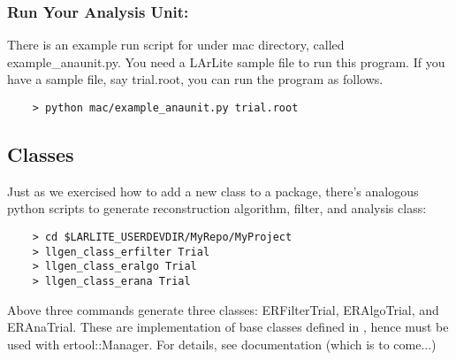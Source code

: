 \subsubsection{Run Your Analysis Unit: \PyROOT}
\label{sec:yourrunscript}
There is an example \python run script for \anaunit under {\ttfamily mac} directory, called 
{\ttfamily example\_anaunit.py}. You need a LArLite sample \ROOT file to run this program. 
If you have a sample file, say {\ttfamily trial.root}, you can run the program as follows.
\begin{lstlisting}
    > python mac/example_anaunit.py trial.root
\end{lstlisting}

\subsection{\ertool Classes}
Just as we exercised how to add a new \CPP class to a package, there's analogous python scripts to
generate \ertool reconstruction algorithm, filter, and analysis class:
\begin{lstlisting}
    > cd $LARLITE_USERDEVDIR/MyRepo/MyProject
    > llgen_class_erfilter Trial
    > llgen_class_eralgo Trial
    > llgen_class_erana Trial
\end{lstlisting}
Above three commands generate three \CPP classes: {\ttfamily ERFilterTrial}, {\ttfamily ERAlgoTrial}, and {\ttfamily ERAnaTrial}.
These are implementation of base classes defined in \ertool, hence must be used with {\ttfamily ertool::Manager}.
For details, see \ertool documentation (which is to come...)


